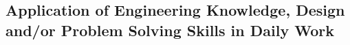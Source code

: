\subsection{Application of Engineering Knowledge, Design and/or Problem Solving Skills in Daily Work}